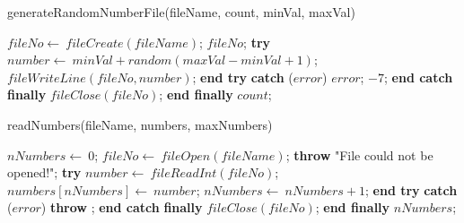 \documentclass[a4paper,10pt]{article}
\begin{document}
\begin{algorithm}
\caption{generateRandomNumberFile(fileName, count, minVal, maxVal)}
\begin{algorithmic}[5]

\STATE {}
\STATE {}
\STATE {}
\STATE {}
  \STATE \(fileNo\gets\ fileCreate(fileName)\);
    \RETURN\(fileNo\);
  \ENDIF
  \STATE \textbf{try}  \BODY
      \STATE \(number\gets\ minVal+random(maxVal-minVal+1)\);
      \STATE \(fileWriteLine(fileNo,number)\);
    \ENDFOR
  \ENDBODY \STATE \textbf{end try}
  \STATE \textbf{catch} (\(error\)) \BODY
    \PRINT\(error\);
    \RETURN\(-7\);
  \ENDBODY \STATE \textbf{end catch}
  \STATE \textbf{finally} \BODY
    \STATE \(fileClose(fileNo)\);
  \ENDBODY \STATE \textbf{end finally}
  \RETURN\(count\);

\end{algorithmic}
\end{algorithm}


\begin{algorithm}
\caption{readNumbers(fileName, numbers, maxNumbers)}
\begin{algorithmic}[5]

\STATE {}
\STATE {}
\STATE {}
  \STATE \(nNumbers\gets\ 0\);
  \STATE \(fileNo\gets\ fileOpen(fileName)\);
    \STATE \textbf{throw} \(\)"{}File could not be opened!"{}\(\);
  \ENDIF
  \STATE \textbf{try}  \BODY
      \STATE \(number\gets\ fileReadInt(fileNo)\);
      \STATE \(numbers[nNumbers]\gets\ number\);
      \STATE \(nNumbers\gets\ nNumbers+1\);
    \ENDWHILE
  \ENDBODY \STATE \textbf{end try}
  \STATE \textbf{catch} (\(error\)) \BODY
    \STATE \textbf{throw} \(\);
  \ENDBODY \STATE \textbf{end catch}
  \STATE \textbf{finally} \BODY
    \STATE \(fileClose(fileNo)\);
  \ENDBODY \STATE \textbf{end finally}
  \RETURN\(nNumbers\);

\end{algorithmic}
\end{algorithm}
\end{document}
